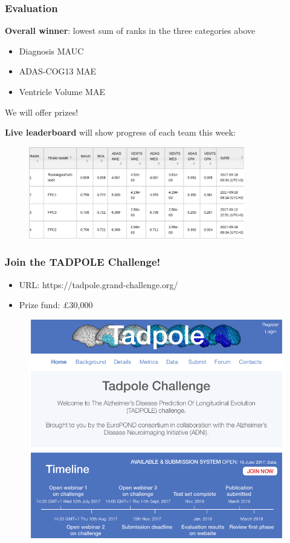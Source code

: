 \documentclass[8pt,xcolor=table]{beamer}
\begin{document}
\begin{frame}
\frametitle{Evaluation}


% 
% 

\textbf{Overall winner}: lowest sum of ranks in the three categories above
\begin{itemize}
 \item Diagnosis MAUC
 \item ADAS-COG13 MAE
 \item Ventricle Volume MAE
\end{itemize}

\vfill

We will offer prizes!

\vfill

\textbf{Live leaderboard} will show progress of each team this week:
\begin{figure}
\centering
\includegraphics[height=4cm]{../leaderboard} 
\end{figure}

\end{frame}


\begin{frame}
\frametitle{Join the TADPOLE Challenge!}

\begin{itemize}
 \item URL: https://tadpole.grand-challenge.org/
 \item Prize fund: \pounds 30,000
\end{itemize}

\begin{figure}
\centering
\includegraphics[scale=0.4,trim=0 270 0 0,clip]{../tadpole} 
\end{figure}


\end{frame}
\end{document}
